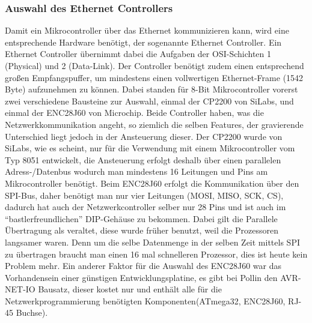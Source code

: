 \documentclass[a4paper,14pt,headsepline]{scrartcl}
\begin{document}
\subsubsection{Auswahl des Ethernet Controllers}
Damit ein Mikrocontroller über das Ethernet kommunizieren kann, wird eine entsprechende Hardware benötigt, der sogenannte Ethernet Controller. Ein Ethernet Controller übernimmt dabei die Aufgaben der OSI-Schichten 1 (Physical) und 2 (Data-Link). Der Controller benötigt zudem einen entsprechend großen Empfangspuffer, um mindestens einen vollwertigen Ethernet-Frame (1542 Byte) aufzunehmen zu können. Dabei standen für 8-Bit Mikrocontroller vorerst zwei verschiedene Bausteine zur Auswahl, einmal der CP2200 von SiLabs, und einmal der ENC28J60 von Microchip. Beide Controller haben, was die Netzwerkkommunikation angeht, so ziemlich die selben Features, der gravierende Unterschied liegt jedoch in der Ansteuerung dieser. Der CP2200 wurde von SiLabs, wie es scheint, nur für die Verwendung mit einem Mikrocontroller vom Typ 8051 entwickelt, die Ansteuerung erfolgt deshalb über einen parallelen Adress-/Datenbus wodurch man mindestens 16 Leitungen und Pins am Mikrocontroller benötigt. Beim ENC28J60 erfolgt die Kommunikation über den SPI-Bus, daher benötigt man nur vier Leitungen (MOSI, MISO, SCK, CS), dadurch hat auch der Netzwerkcontroller selber nur 28 Pins und ist auch im "`bastlerfreundlichen"' DIP-Gehäuse zu bekommen. Dabei gilt die Parallele Übertragung als veraltet, diese wurde früher benutzt, weil die Prozessoren langsamer waren. Denn um die selbe Datenmenge in der selben Zeit mittels SPI zu übertragen braucht man einen 16 mal schnelleren Prozessor, dies ist heute kein Problem mehr. Ein anderer Faktor für die Auswahl des ENC28J60 war das Vorhandensein einer günstigen Entwicklungsplatine, es gibt bei Pollin den AVR-NET-IO Bausatz, dieser kostet nur  und enthält alle für die Netzwerkprogrammierung benötigten Komponenten(ATmega32, ENC28J60, RJ-45 Buchse).
\end{document}
